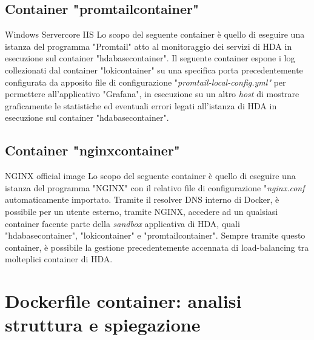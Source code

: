 \subsection{Container "promtailcontainer"}
\begin{namespacedesc}
	 {Windows Servercore IIS}
	 {Lo scopo del seguente container è quello di eseguire una istanza del programma "Promtail" atto al monitoraggio dei servizi di HDA in esecuzione sul container "hdabasecontainer". Il seguente container espone i log collezionati dal container "lokicontainer" su una specifica porta precedentemente configurata da apposito file di configurazione "\textit{promtail-local-config.yml"} per permettere all'applicativo "Grafana", in esecuzione su un altro \textit{host} di mostrare graficamente le statistiche ed eventuali errori legati all'istanza di HDA in esecuzione sul container "hdabasecontainer".}
\end{namespacedesc}	

\subsection{Container "nginxcontainer"}
\begin{namespacedesc}
	 {NGINX official image}
	 {Lo scopo del seguente container è quello di eseguire una istanza del programma "NGINX" con il relativo file di configurazione "\textit{nginx.conf} automaticamente importato. Tramite il resolver DNS interno di Docker, è possibile per un utente esterno, tramite NGINX, accedere ad un qualsiasi container facente parte della \textit{sandbox} applicativa di HDA, quali "hdabasecontainer", "lokicontainer" e "promtailcontainer". Sempre tramite questo container, è possibile la gestione precedentemente accennata di load-balancing tra molteplici container di HDA.}
\end{namespacedesc}	

\section{Dockerfile container: analisi struttura e spiegazione}


